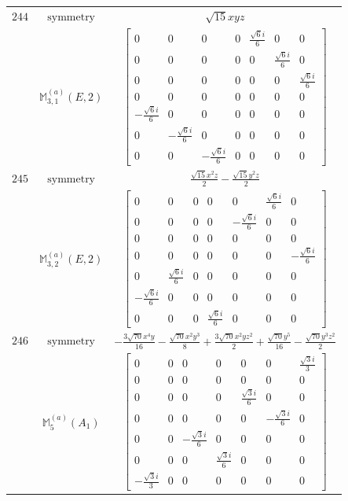 \documentclass[fleqn,8pt,landscape]{jsarticle}
\begin{document}
\begin{longtable}{ccc}
$ 244 $ & $ \text{symmetry} $ & $ \sqrt{15} x y z $ \\
$  $ & $ \mathbb{M}_{3,1}^{(a)}(E,2) $ & $ \begin{bmatrix} 0 & 0 & 0 & 0 & \frac{\sqrt{6} i}{6} & 0 & 0 \\ 0 & 0 & 0 & 0 & 0 & \frac{\sqrt{6} i}{6} & 0 \\ 0 & 0 & 0 & 0 & 0 & 0 & \frac{\sqrt{6} i}{6} \\ 0 & 0 & 0 & 0 & 0 & 0 & 0 \\ - \frac{\sqrt{6} i}{6} & 0 & 0 & 0 & 0 & 0 & 0 \\ 0 & - \frac{\sqrt{6} i}{6} & 0 & 0 & 0 & 0 & 0 \\ 0 & 0 & - \frac{\sqrt{6} i}{6} & 0 & 0 & 0 & 0 \end{bmatrix} $ \\ \hline
$ 245 $ & $ \text{symmetry} $ & $ \frac{\sqrt{15} x^{2} z}{2} - \frac{\sqrt{15} y^{2} z}{2} $ \\
$  $ & $ \mathbb{M}_{3,2}^{(a)}(E,2) $ & $ \begin{bmatrix} 0 & 0 & 0 & 0 & 0 & \frac{\sqrt{6} i}{6} & 0 \\ 0 & 0 & 0 & 0 & - \frac{\sqrt{6} i}{6} & 0 & 0 \\ 0 & 0 & 0 & 0 & 0 & 0 & 0 \\ 0 & 0 & 0 & 0 & 0 & 0 & - \frac{\sqrt{6} i}{6} \\ 0 & \frac{\sqrt{6} i}{6} & 0 & 0 & 0 & 0 & 0 \\ - \frac{\sqrt{6} i}{6} & 0 & 0 & 0 & 0 & 0 & 0 \\ 0 & 0 & 0 & \frac{\sqrt{6} i}{6} & 0 & 0 & 0 \end{bmatrix} $ \\ \hline
$ 246 $ & $ \text{symmetry} $ & $ - \frac{3 \sqrt{70} x^{4} y}{16} - \frac{\sqrt{70} x^{2} y^{3}}{8} + \frac{3 \sqrt{70} x^{2} y z^{2}}{2} + \frac{\sqrt{70} y^{5}}{16} - \frac{\sqrt{70} y^{3} z^{2}}{2} $ \\
$  $ & $ \mathbb{M}_{5}^{(a)}(A_{1}) $ & $ \begin{bmatrix} 0 & 0 & 0 & 0 & 0 & 0 & \frac{\sqrt{3} i}{3} \\ 0 & 0 & 0 & 0 & 0 & 0 & 0 \\ 0 & 0 & 0 & 0 & \frac{\sqrt{3} i}{6} & 0 & 0 \\ 0 & 0 & 0 & 0 & 0 & - \frac{\sqrt{3} i}{6} & 0 \\ 0 & 0 & - \frac{\sqrt{3} i}{6} & 0 & 0 & 0 & 0 \\ 0 & 0 & 0 & \frac{\sqrt{3} i}{6} & 0 & 0 & 0 \\ - \frac{\sqrt{3} i}{3} & 0 & 0 & 0 & 0 & 0 & 0 \end{bmatrix} $ \\ \hline

\end{longtable}
\end{document}
